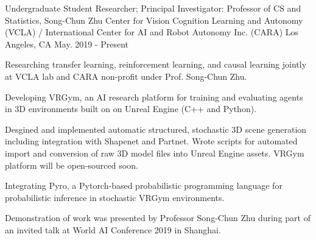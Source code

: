 

\begin{cventries}

  \cventry
    {Undergraduate Student Researcher; Principal Investigator: Professor of CS and Statistics, Song-Chun Zhu} %
    {Center for Vision Cognition Learning and Autonomy (VCLA) / \newline
    International Center for AI and Robot Autonomy Inc. (CARA)} %
    {Los Angeles, CA} %
    {May. 2019 - Present} %
    {
      \begin{cvitems} %
        \item {Researching transfer learning, reinforcement learning, and causal learning jointly at VCLA lab and CARA non-profit under Prof. Song-Chun Zhu.}
        \item {Developing VRGym, an AI research platform for training and evaluating agents in
        3D environments built on on Unreal Engine (C++ and Python). } 
        \item {Desgined and implemented automatic structured, stochastic 3D scene generation including integration with Shapenet and Partnet. 
        Wrote scripts for automated import and conversion of raw 3D model files into Unreal Engine assets. VRGym platform will be open-sourced soon.}
        \item {Integrating Pyro, a Pytorch-based probabilistic programming language for probabilistic inference in stochastic VRGym environments.}
        \item {Demonstration of work was presented by Professor Song-Chun Zhu during part of an invited talk at World AI Conference 2019 in Shanghai.}
      \end{cvitems}
    }


\end{cventries}
